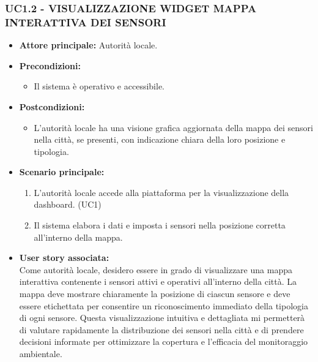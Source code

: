 \subsubsection{UC1.2 - VISUALIZZAZIONE WIDGET MAPPA INTERATTIVA DEI SENSORI}
\begin{itemize}
    \item \textbf{Attore principale:} Autorità locale.
    \item \textbf{Precondizioni:}
        \begin{itemize}
            \item  Il sistema è operativo e accessibile.
        \end{itemize}
    \item \textbf{Postcondizioni:}
        \begin{itemize}
            \item L’autorità locale ha una visione grafica aggiornata della mappa dei sensori nella città, se presenti, con indicazione chiara della loro posizione e tipologia.
        \end{itemize}
    \item \textbf{Scenario principale:}
        \begin{enumerate}
            \item L'autorità locale accede alla piattaforma per la visualizzazione della dashboard. (UC1)
            \item Il sistema elabora i dati e imposta i sensori nella posizione corretta all'interno della mappa.
        \end{enumerate}
    \item \textbf{User story associata:} \\
        Come autorità locale, desidero essere in grado di visualizzare una mappa interattiva contenente i sensori attivi e operativi all’interno della città. La mappa deve mostrare chiaramente la posizione di ciascun sensore e deve essere etichettata per consentire un riconoscimento immediato della tipologia di ogni sensore. Questa visualizzazione intuitiva e dettagliata mi permetterà di valutare rapidamente la distribuzione dei sensori nella città e di prendere decisioni informate per ottimizzare la copertura e l'efficacia del monitoraggio ambientale.
\end{itemize}